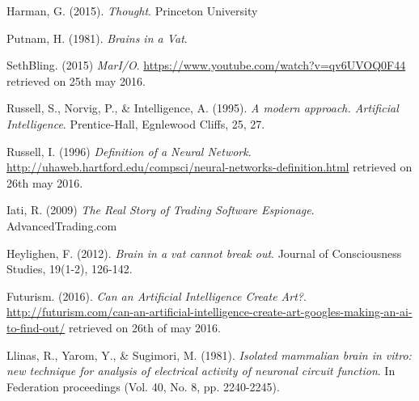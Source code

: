 \documentclass[a4paper]{article}
\begin{document}
\begin{thebibliography}{9}

  Harman, G. (2015). \emph{Thought}. Princeton University 

  Putnam, H. (1981). \emph{Brains in a Vat}.
  
  SethBling. (2015) \emph{MarI/O}. \url{https://www.youtube.com/watch?v=qv6UVOQ0F44} retrieved on 25th may 2016.
  
Russell, S., Norvig, P., \& Intelligence, A. (1995). \emph{A modern approach. Artificial Intelligence}. Prentice-Hall, Egnlewood Cliffs, 25, 27.

Russell, I. (1996) \emph{Definition of a Neural Network}. \url{http://uhaweb.hartford.edu/compsci/neural-networks-definition.html} retrieved on 26th may 2016.

 Iati, R. (2009) \emph{The Real Story of Trading Software Espionage}. AdvancedTrading.com
 
 Heylighen, F. (2012). \emph{Brain in a vat cannot break out}. Journal of Consciousness Studies, 19(1-2), 126-142.
 
Futurism. (2016). \emph{Can an Artificial Intelligence Create Art?}. \url{http://futurism.com/can-an-artificial-intelligence-create-art-googles-making-an-ai-to-find-out/} retrieved on 26th of may 2016.

Llinas, R., Yarom, Y., \& Sugimori, M. (1981). \emph{Isolated mammalian brain in vitro: new technique for analysis of electrical activity of neuronal circuit function}. In Federation proceedings (Vol. 40, No. 8, pp. 2240-2245).

\end{thebibliography}
\end{document}
